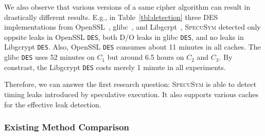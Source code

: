 \documentclass[sigconf, review]{acmart}
\newcommand{\SpecuSym}{\textsc{SpecuSym} }
\begin{document}
We also observe that various versions of a same cipher algorithm can result 
in drastically different results. E.g., in Table~\ref{tbl:detection} three 
DES implementations from OpenSSL~\cite{OpenSSL111c}, glibc~\cite{glibc}, and 
Libgcrpt~\cite{Libgcrypt}, \SpecuSym detected only oppsite leaks in OpenSSL 
\texttt{DES}, both D/O leaks in glibc \texttt{DES}, and no leaks in Libgcrypt 
\texttt{DES}. Also, OpenSSL \texttt{DES} consumes about 11 minutes in all caches. 
The glibc \texttt{DES} uses 52 minutes on $C_1$ but around 6.5 hours on $C_2$ 
and $C_3$. By constrast, the Libgcrypt \texttt{DES} costs merely 1 minute in 
all experiments. 


Therefore, we can answer the first research question: \SpecuSym is able to 
detect timing leaks introduced by speculative execution. It also supports 
various caches for the effective leak detection.


\subsubsection{Existing Method Comparison}

\begin{table}
\caption{Comparison betwee Wu et.al~\cite{WuW19} and \SpecuSym}
\label{tbl:cmp}
\centering
{}
\end{table}
\end{document}
